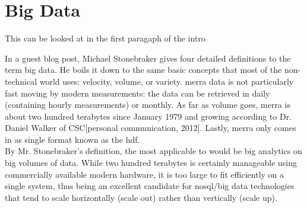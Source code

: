 \chapter{Big Data}



This can be looked at in the first paragaph of the intro


In a guest blog post, Michael Stonebraker gives four detailed definitions to the term big data\cite{stonebraker}. He boils it down to the same basic concepts that most of the non-technical world uses: velocity, volume, or variety. \gls{merra} data is not particularly fast moving by modern measurements: the data can be retrieved in daily (containing hourly measurements) or monthly. As far as volume goes, \gls{merra} is about two hundred terabytes since January 1979 and growing according to Dr. Daniel Walker of CSC[personal communication, 2012]. Lastly, \gls{merra} only comes in as single format known as the \gls{hdf}\cite{hdf}.\\

By Mr. Stonebraker's definition, the most applicable to \climatedge would be big analytics on big volumes of data. While two hundred terabytes is certainly manageable using commercially available modern hardware, it is too large to fit efficiently on a single system, thus being an excellent candidate for \gls{nosql}/big data technologies that tend to scale horizontally (scale out) rather than vertically (scale up).




\renewcommand\bibname{{References}}





